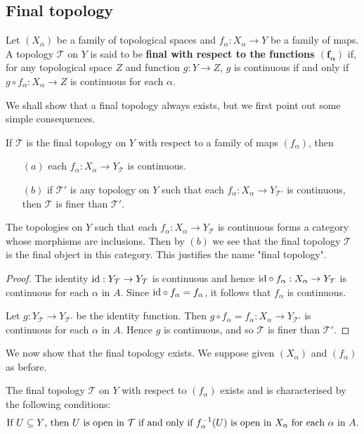 \subsection{Final topology}
\begin{definition}
Let $(X_\alpha)$ be a family of topological spaces and $f_\alpha:X_\alpha\to Y$ be a family of maps. A topology $\mathcal{T}$ on $Y$ is said to be 
\textbf{final with respect to the functions $\bm{(f_\alpha)}$} if, for any topological space $Z$ and function $g:Y\to Z$, $g$ is continuous if and only if $g\circ f_\alpha:X_\alpha\to Z$ 
is continuous for each $\alpha$.
\end{definition}
We shall show that a final topology always exists, but we first point out some simple consequences.
\begin{proposition}\label{final topo prop}
If $\mathcal{T}$ is the final topology on $Y$ with respect to a family of maps $(f_\alpha)$, then
\begin{itemize}
\item[$(a)$] each $f_\alpha:X_\alpha\to Y_\mathcal{T}$ is continuous.
\item[$(b)$] if $\mathcal{T}'$ is any topology on $Y$ such that each $f_\alpha:X_\alpha\to Y_{\mathcal{T}'}$ is continuous, then $\mathcal{T}$ is finer than 
$\mathcal{T}'$.
\end{itemize}
\end{proposition}
The topologies on $Y$ such that each $f_\alpha:X_\alpha\to Y_{\mathcal{T}}$ is continuous forms a category whose morphisms are inclusions. Then by $(b)$ we see that 
the final topology $\mathcal{T}$ is the final object in this category. This justifies the name "final topology".
\begin{proof}
The identity $\mathrm{id}:Y_\mathcal{T}\to Y_\mathcal{T}$ is continuous and hence $\mathrm{id}\circ f_\alpha:X_\alpha\to Y_{\mathcal{T}}$ is continuous for each $\alpha$ in $A$. Since 
$\mathrm{id}\circ f_\alpha=f_\alpha$, it follows that $f_\alpha$ is continuous.\par
Let $g:Y_{\mathcal{T}}\to Y_{\mathcal{T}'}$ be the identity function. Then $g\circ f_\alpha=f_\alpha:X_\alpha\to Y_{\mathcal{T}'}$ is continuous for each $\alpha$ in $A$. 
Hence $g$ is continuous, and so $\mathcal{T}$ is finer than $\mathcal{T}'$.
\end{proof}
We now show that the final topology exists. We suppose given $(X_\alpha)$ and $(f_\alpha)$ as before.
\begin{proposition}
The final topology $\mathcal{T}$ on $Y$ with respect to $(f_\alpha)$ exists and is characterised by the following conditions:
\begin{equation}\label{final topo char-1}
\text{If $U\subseteq Y$, then $U$ is open in $\mathcal{T}$ if and only if $f_\alpha^{-1}(U)$ is open in $X_\alpha$ for each $\alpha$ in $A$}.
\end{equation}
\end{proposition}
